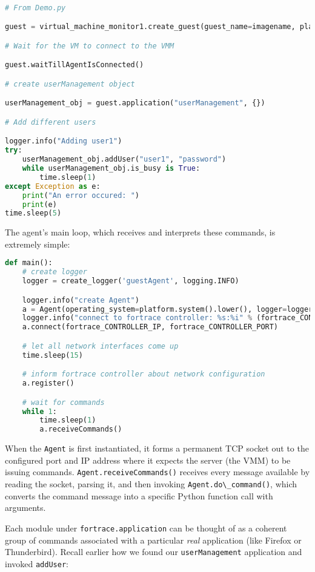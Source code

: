 \documentclass[letterpaper,12pt]{report}
\newcommand{\passthrough}[1]{#1}
\begin{document}
\begin{lstlisting}[language=Python]

# From Demo.py

guest = virtual_machine_monitor1.create_guest(guest_name=imagename, platform="windows")

# Wait for the VM to connect to the VMM

guest.waitTillAgentIsConnected()

# create userManagement object

userManagement_obj = guest.application("userManagement", {})

# Add different users

logger.info("Adding user1")
try:
    userManagement_obj.addUser("user1", "password")
    while userManagement_obj.is_busy is True:
        time.sleep(1)
except Exception as e:
    print("An error occured: ")
    print(e)
time.sleep(5)
\end{lstlisting}

The agent's main loop, which receives and interprets these commands, is
extremely simple:

\begin{lstlisting}[language=Python]
def main():
    # create logger
    logger = create_logger('guestAgent', logging.INFO)

    logger.info("create Agent")
    a = Agent(operating_system=platform.system().lower(), logger=logger)
    logger.info("connect to fortrace controller: %s:%i" % (fortrace_CONTROLLER_IP, fortrace_CONTROLLER_PORT))
    a.connect(fortrace_CONTROLLER_IP, fortrace_CONTROLLER_PORT)

    # let all network interfaces come up
    time.sleep(15)

    # inform fortrace controller about network configuration
    a.register()

    # wait for commands
    while 1:
        time.sleep(1)
        a.receiveCommands()
\end{lstlisting}

When the \passthrough{\lstinline!Agent!} is first instantiated, it forms
a permanent TCP socket out to the configured port and IP address where
it expects the server (the VMM) to be issuing commands.
\passthrough{\lstinline!Agent.receiveCommands()!} receives every message
available by reading the socket, parsing it, and then invoking
\passthrough{\lstinline!Agent.do\_command()!}, which converts the
command message into a specific Python function call with arguments.

Each module under \passthrough{\lstinline!fortrace.application!} can be
thought of as a coherent group of commands associated with a particular
\emph{real} application (like Firefox or Thunderbird). Recall earlier
how we found our \passthrough{\lstinline!userManagement!} application
and invoked \passthrough{\lstinline!addUser!}:
\end{document}
